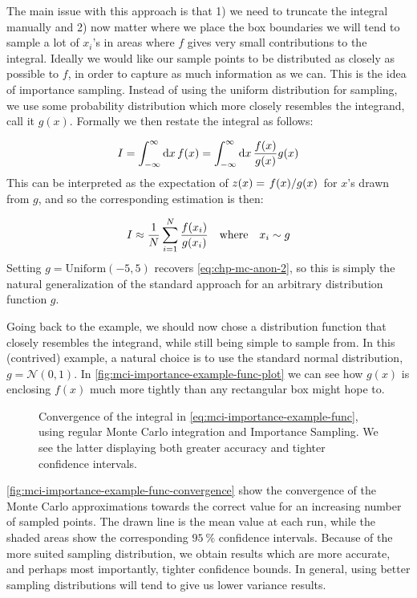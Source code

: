 \documentclass[Thesis.tex]{subfiles}
\begin{document}
The main issue with this approach is that 1) we need to truncate the integral
manually and 2) now matter where we place the box boundaries we will tend to
sample a lot of $x_i$'s in areas where $f$ gives very small contributions to
the integral. Ideally we would like our sample points to be distributed as
closely as possible to $f$, in order to capture as much information as we can.
This is the idea of importance sampling. Instead of using the uniform
distribution for sampling, we use some probability distribution which more
closely resembles the integrand, call it $g(x)$. Formally we then restate the integral as follows:

\begin{align}
    I = \int_{-\infty}^{\infty}\dd{x}f(x) = \int_{-\infty}^{\infty}\dd{x} \frac{f(x)}{g(x)} g(x)
\end{align}
This can be interpreted as the expectation of $z(x)=\flatfrac{f(x)}{g(x)}$ for $x$'s drawn from $g$, and so the corresponding estimation is then:

\begin{align}
    I \approx \frac{1}{N} \sum_{i=1}^N \frac{f(x_i)}{g(x_i)} \qq{where} x_i\sim g
\end{align}
Setting $g = \text{Uniform}(-5, 5)$ recovers \autoref{eq:chp-mc-anon-2}, so this is simply the natural generalization of the standard approach for an arbitrary distribution function $g$.


Going back to the example, we should now chose a distribution function that
closely resembles the integrand, while still being simple to sample from. In
this (contrived) example, a natural choice is to use the standard normal
distribution, $g = \mathcal{N}(0, 1)$. In
\autoref{fig:mci-importance-example-func-plot} we can see how $g(x)$ is
enclosing $f(x)$ much more tightly than any rectangular box might hope to.

\begin{figure}
   \centering
    \resizebox{\linewidth}{!}{%
        
    }
    \caption{\label{fig:mci-importance-example-func-convergence}Convergence of the integral in
    \autoref{eq:mci-importance-example-func}, using regular Monte Carlo
    integration and Importance Sampling. We see the latter displaying both
    greater accuracy and tighter confidence intervals.}
\end{figure}

\autoref{fig:mci-importance-example-func-convergence} show the convergence of
the Monte Carlo approximations towards the correct value for an increasing
number of sampled points. The drawn line is the mean value at each run, while
the shaded areas show the corresponding $\SI{95}{\percent}$ confidence
intervals. Because of the more suited sampling distribution, we obtain results
which are more accurate, and perhaps most importantly, tighter confidence
bounds. In general, using better sampling distributions will tend to give us
lower variance results.
\end{document}
